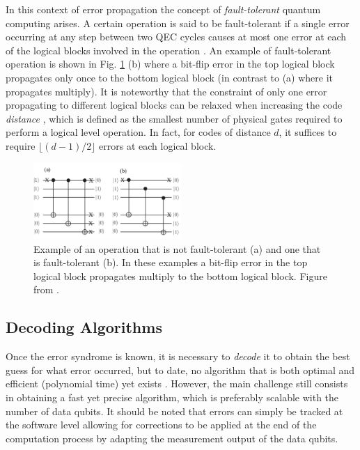 In this context of error propagation the concept of \textit{fault-tolerant}
quantum computing arises. A certain operation is said to be fault-tolerant if a
single error occurring at any step between two QEC cycles causes at most one
error at each of the logical blocks involved in the operation
\cite{Devitt_2013}. An example of fault-tolerant operation is shown in Fig.
\ref{fig:fault_tol} (b) where a bit-flip error in the top logical block
propagates only once to the bottom logical block (in contrast to (a) where it
propagates multiply). It is noteworthy that the constraint of only one error
propagating to different logical blocks can be relaxed when increasing the code
\textit{distance} \cite{Devitt_2013}, which is defined as the
smallest number of physical gates required to perform a logical level operation.
In fact, for codes of distance $d$, it suffices to require $\lfloor{(d-1)/2}
\rfloor$ errors at each logical block.

\begin{figure}[htbp]
  \centering
  \includegraphics[width=0.5\textwidth]{images/fault_tolerance.pdf}
  \caption{Example of an operation that is not fault-tolerant (a) and one that is
    fault-tolerant (b). In these examples a bit-flip error in the top logical
    block propagates multiply to the bottom logical block. Figure
    from \cite{Devitt_2013}.}
  \label{fig:fault_tol}
\end{figure}

\subsection{Decoding Algorithms}
Once the error syndrome is known, it is necessary to \textit{decode} it to
obtain the best guess for what error occurred, but to date, no algorithm that is
both optimal and efficient (polynomial time) yet exists \cite{Berlekamp}.
However, the main challenge still consists in obtaining a fast yet precise
algorithm, which is preferably scalable with the number of data qubits. It
should be noted that errors can simply be tracked at the software level allowing
for corrections to be applied at the end of the computation process by adapting
the measurement output of the data qubits.

